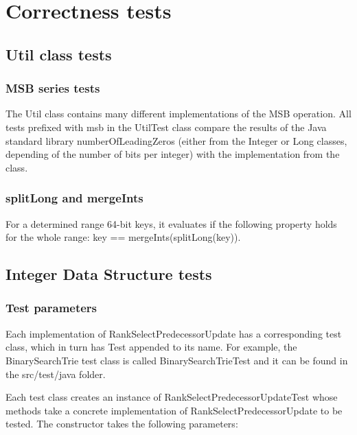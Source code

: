 \chapter{Correctness tests}

\section{{\ttfamily Util} class tests}

\subsection{MSB series tests}

The {\ttfamily Util} class contains many different implementations of the MSB operation. All tests prefixed with {\ttfamily msb} in the {\ttfamily UtilTest} class compare the results of the Java standard library {\ttfamily numberOfLeadingZeros} (either from the {\ttfamily Integer} or {\ttfamily Long} classes, depending of the number of bits per integer) with the implementation from the class.

\subsection{{\ttfamily splitLong} and {\ttfamily mergeInts}}

For a determined range 64-bit keys, it evaluates if the following property holds for the whole range: {\ttfamily key == mergeInts(splitLong(key))}.

\section{Integer Data Structure tests}

\subsection{Test parameters}

Each implementation of {\ttfamily RankSelectPredecessorUpdate} has a corresponding test class, which in turn has {\ttfamily Test} appended to its name. For example, the {\ttfamily BinarySearchTrie} test class is called {\ttfamily BinarySearchTrieTest} and it can be found in the {\ttfamily src/test/java} folder.

Each test class creates an instance of {\ttfamily RankSelectPredecessorUpdateTest} whose methods take a concrete implementation of {\ttfamily RankSelectPredecessorUpdate} to be tested. The constructor takes the following parameters:

